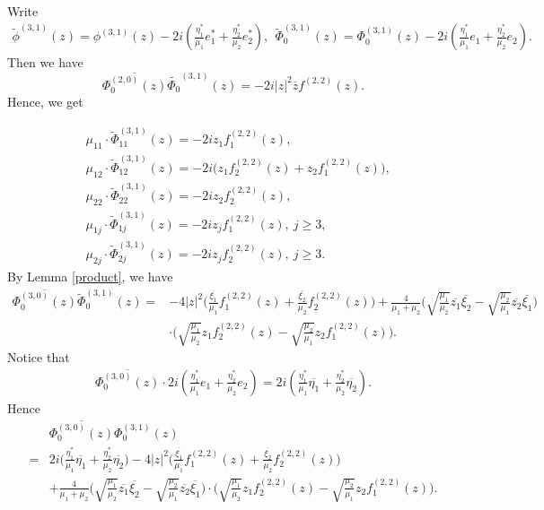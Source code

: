 \documentclass[12pt]{article}
\numberwithin{equation}{section}
\def\w{\widetilde}
\def\ov{\overline}
\def\wt{\widetilde}
\begin{document}
Write
\begin{equation}\begin{split}
\w{\phi}^{(3,1)}(z)=\phi^{(3,1)}(z)-2i(\frac{\eta^*_1}{\mu_1}e^*_1+\frac{\eta^*_2}{\mu_2}e^*_2),\
\ \text{{$\w \Phi^{(3,1)}_0(z)=\Phi^{(3,1)}_0(z)
-2i(\frac{\eta_1^*}{\mu_1}e_1 + \frac{\eta_2^*}{\mu_2} e_2)$}}.
\end{split}\end{equation}
Then we have
$$
\ov{\Phi_0^{(2,0)}(z)}\wt{\Phi_0}^{(3,1)}(z)=-2i|z|^2\ov{z}f^{(2,2)}(z).$$
Hence, we get

\begin{equation}\begin{split}
&\mu_{11}\cdot \w{\Phi}_{11}^{(3,1)}(z)=-2iz_1f_1^{(2,2)}(z),\\
&\mu_{12}\cdot \w{\Phi}_{12}^{(3,1)}(z)=-2i\big(z_1f_2^{(2,2)}(z)+z_2f_1^{(2,2)}(z)\big),\\
&\mu_{22}\cdot \w{\Phi}_{22}^{(3,1)}(z)=-2iz_2f_2^{(2,2)}(z),\\
&\mu_{1j}\cdot \w{\Phi}_{1j}^{(3,1)}(z)=-2iz_jf_1^{(2,2)}(z),\ j\ge 3,\\
&\mu_{2j}\cdot \w{\Phi}_{2j}^{(3,1)}(z)=-2iz_jf_2^{(2,2)}(z),\ j\ge
3.
\end{split}\end{equation}
By Lemma \ref{product}, we have
\begin{equation}\begin{split}
\ov{{\Phi}_0^{(3,0)}(z)}\w{\Phi}_0^{(3,1)}(z)=&-4|z|^2\Big(\frac{\ov{\xi_1}}{\mu_1}f_1^{(2,2)}(z)
+\frac{\ov{\xi_2}}{\mu_2}f_2^{(2,2)}(z)\Big)+\frac{4}{\mu_1+\mu_2}\Big(\sqrt{\frac{\mu_1}{\mu_2}}
\ov{z_1}\ov{\xi_2}-\sqrt{\frac{\mu_2}{\mu_1}}\ov{z_2}\ov{\xi_1}\Big)\\
&\cdot
\Big(\sqrt{\frac{\mu_1}{\mu_2}}z_1f_2^{(2,2)}(z)-\sqrt{\frac{\mu_2}{\mu_1}}z_2f_1^{(2,2)}(z)\Big).
\end{split}\end{equation}
Notice that
\begin{equation}\begin{split}
\ov{{\Phi}_0^{(3,0)}(z)}\cdot
2i(\frac{\eta^*_1}{\mu_1}e_1+\frac{\eta_2^*}{\mu_2}e_2)
=2i(\frac{\eta^*_1}{\mu_1}\ov{\eta_1}+\frac{\eta^*_2}{\mu_2}\ov{\eta_2}).
\end{split}\end{equation}
Hence
\begin{equation}\begin{split}\label{97eq2}
&\ov{{\Phi}_0^{(3,0)}(z)}{\Phi}_0^{(3,1)}(z)\\
=&2i\big(\frac{\eta^*_1}{\mu_1}\ov{\eta_1}
+\frac{\eta^*_2}{\mu_2}\ov{\eta_2}\big)
-4|z|^2\Big(\frac{\ov{\xi_1}}{\mu_1}f_1^{(2,2)}(z)+\frac{\ov{\xi_2}}{\mu_2}f_2^{(2,2)}(z)\Big)\\
&+\frac{4}{\mu_1+\mu_2}\Big(\sqrt{\frac{\mu_1}{\mu_2}}
\ov{z_1}\ov{\xi_2}-\sqrt{\frac{\mu_2}{\mu_1}}\ov{z_2}\ov{\xi_1}\Big)\cdot
         \Big(\sqrt{\frac{\mu_1}{\mu_2}}z_1f_2^{(2,2)}(z)-\sqrt{\frac{\mu_2}{\mu_1}}z_2f_1^{(2,2)}(z)\Big).
\end{split}\end{equation}
\end{document}
